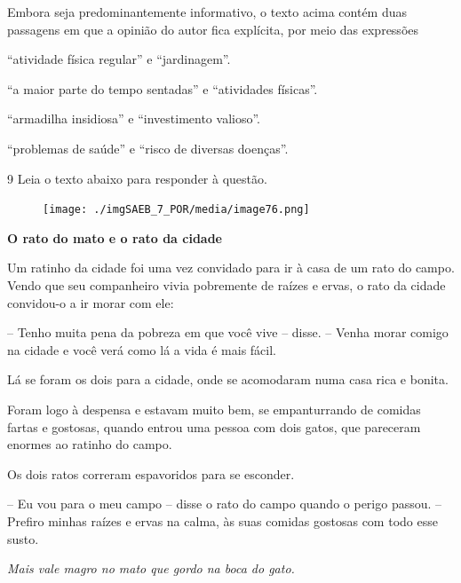 Embora seja predominantemente informativo, o texto acima contém duas passagens
em que a opinião do autor fica explícita, por meio das expressões 

\begin{escolha}

    \item ``atividade física regular'' e ``jardinagem''. 

    \item ``a maior parte do tempo sentadas'' e ``atividades físicas''.  

    \item ``armadilha insidiosa'' e ``investimento valioso''.  

    \item ``problemas de saúde'' e ``risco de diversas doenças''. 

\end{escolha}

\num{9} Leia o texto abaixo para responder à questão. 

\begin{myquote}

\begin{figure}[H]
\centering
\texttt{[image: ./imgSAEB\_7\_POR/media/image76.png]}
\end{figure} 

\textbf{O rato do mato e o rato da cidade}

Um ratinho da cidade foi uma vez convidado para ir à casa
de um rato do campo. Vendo que seu companheiro vivia pobremente de
raízes e ervas, o rato da cidade convidou-o a ir morar com ele:

-- Tenho muita pena da pobreza em que você vive --
disse. -- Venha morar comigo na cidade e você verá como lá a
vida é mais fácil.

Lá se foram os dois para a cidade, onde se acomodaram
numa casa rica e bonita.

Foram logo à despensa e estavam muito bem, se
empanturrando de comidas fartas e gostosas, quando entrou uma
pessoa com dois gatos, que pareceram enormes ao ratinho do
campo.

Os dois ratos correram espavoridos para se esconder.

-- Eu vou para o meu campo -- disse o rato do campo
quando o perigo passou. -- Prefiro minhas raízes e ervas na
calma, às suas comidas gostosas com todo esse susto.

\textit{Mais vale magro no mato que gordo na boca do gato.} 


\end{myquote}

